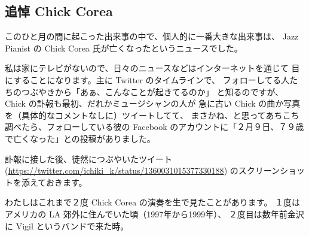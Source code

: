 \documentclass[dvipdfmx,autodetect-engine,10pt,b5paper,papersize,openany,dvipsnames]{jsbook}
\begin{document}
\begin{multicols}{2}

\section{追悼 Chick Corea}

\vspace{7.8cm}

このひと月の間に起こった出来事の中で、個人的に一番大きな出来事は、
Jazz Pianist の Chick Corea 氏が亡くなったというニュースでした。

私は家にテレビがないので、日々のニュースなどはインターネットを通じて
目にすることになります。主に Twitter のタイムラインで、
フォローしてる人たちのつぶやきから「あぁ、こんなことが起きてるのか」
と知るのですが、 Chick の訃報も最初、だれかミュージシャンの人が
急に古い Chick の曲か写真を（具体的なコメントなしに）ツイートしてて、
まさかね、と思ってあちこち調べたら、フォローしている彼の Facebook
のアカウントに「２月９日、７９歳で亡くなった」との投稿がありました。

訃報に接した後、徒然につぶやいたツイート
(\url{https://twitter.com/ichiki_k/status/1360031015377330188})
のスクリーンショットを添えておきます。

わたしはこれまで２度 Chick Corea の演奏を生で見たことがあります。
１度はアメリカの LA 郊外に住んでいた頃（1997年から1999年）、
２度目は数年前金沢に Vigil というバンドで来た時。


\end{multicols}
\end{document}

